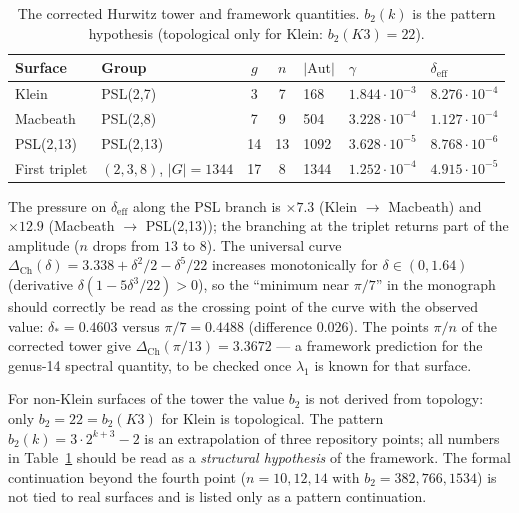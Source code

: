 \documentclass[11pt,a4paper]{article}
\begin{document}
\begin{table}[htbp]
\centering\small
\caption{The corrected Hurwitz tower and framework quantities. $b_2(k)$ is the
pattern hypothesis (topological only for Klein: $b_2(K3) = 22$).}
\label{tab:tower}
\begin{tabular}{llcclll}
\toprule
Surface & Group & $g$ & $n$ & $|\mathrm{Aut}|$ & $\gamma$ & $\delta_{\mathrm{eff}}$ \\
\midrule
Klein & PSL(2,7) & 3 & 7 & 168 & $1.844\cdot10^{-3}$ & $8.276\cdot10^{-4}$ \\
Macbeath & PSL(2,8) & 7 & 9 & 504 & $3.228\cdot10^{-4}$ & $1.127\cdot10^{-4}$ \\
PSL(2,13) & PSL(2,13) & 14 & 13 & 1092 & $3.628\cdot10^{-5}$ & $8.768\cdot10^{-6}$ \\
First triplet & $(2,3,8)$, $|G|=1344$ & 17 & 8 & 1344 & $1.252\cdot10^{-4}$ & $4.915\cdot10^{-5}$ \\
\bottomrule
\end{tabular}
\end{table}

The pressure on $\delta_{\mathrm{eff}}$ along the PSL branch is $\times 7.3$
(Klein $\to$ Macbeath) and $\times 12.9$ (Macbeath $\to$ PSL(2,13)); the
branching at the triplet returns part of the amplitude ($n$ drops from $13$ to
$8$). The universal curve $\Delta_{\mathrm{Ch}}(\delta) = 3.338 + \delta^2/2 -
\delta^5/22$ increases monotonically for $\delta \in (0, 1.64)$ (derivative
$\delta(1 - 5\delta^3/22) > 0$), so the ``minimum near $\pi/7$'' in the
monograph should correctly be read as the crossing point of the curve with the
observed value: $\delta_* = 0.4603$ versus $\pi/7 = 0.4488$ (difference
$0.026$). The points $\pi/n$ of the corrected tower give
$\Delta_{\mathrm{Ch}}(\pi/13) = 3.3672$ --- a framework prediction for the
genus-14 spectral quantity, to be checked once $\lambda_1$ is known for that
surface.

\begin{honestybox}
For non-Klein surfaces of the tower the value $b_2$ is not derived from
topology: only $b_2 = 22 = b_2(K3)$ for Klein is topological. The pattern
$b_2(k) = 3\cdot 2^{k+3}-2$ is an extrapolation of three repository points;
all numbers in Table~\ref{tab:tower} should be read as a \emph{structural
hypothesis} of the framework. The formal continuation beyond the fourth point
($n = 10, 12, 14$ with $b_2 = 382, 766, 1534$) is not tied to real surfaces
and is listed only as a pattern continuation.
\end{honestybox}
\end{document}
